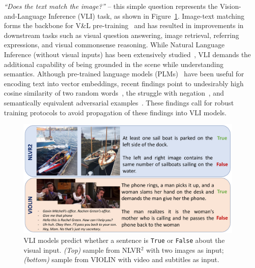 \label{sec:01_intro}
\textit{``Does the text match the image?''} -- this simple question represents the Vision-and-Language Inference (VLI) task,
as shown in Figure~\ref{fig:example_vli}.
Image-text matching forms the backbone for V\&L pre-training~\citep{sun2019videobert,tan2019lxmert,lu2019vilbert,chen2020uniter} and has resulted in improvements in downstream tasks such as visual question answering, image retrieval, referring expressions, and visual commonsense reasoning.
While Natural Language Inference (without visual inputs) has been extensively studied~\citep{bowman2015large,williams2018broad,khot2018scitail,demszky2018transforming}, VLI demands the additional capability of being grounded in the scene while understanding semantics.
Although pre-trained language models (PLMs)~\citep{vaswani2017attention,devlin2019bert,raffel2020exploring} have been useful for encoding text into vector embeddings, recent findings point to undesirably high cosine similarity of two random words~\citep{ethayarajh2019contextual}, the struggle with negation~\citep{kassner2020negated,ettinger2020bert}, and semantically equivalent adversarial examples~\citep{ribeiro2018semantically}.
These findings call for robust training protocols to avoid propagation of these findings into VLI models.
\begin{figure}
    \centering
    \includegraphics[width=\linewidth]{sdro/images/example_nlvr_violin.pdf}
    \caption{
        VLI models predict whether a sentence is \texttt{True} or \texttt{False} about the visual input. \textit{(Top)} sample from NLVR$^2$ with two images as input; \textit{(bottom)} sample from VIOLIN with video and subtitles as input.
        }
    \label{fig:example_vli}
\end{figure}


